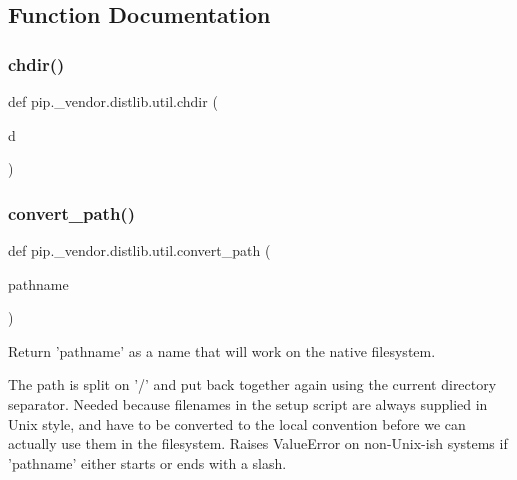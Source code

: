 \subsection{Function Documentation}
\mbox{\label{namespacepip_1_1__vendor_1_1distlib_1_1util_a3e7c4ee14860b0162af512a326ac4005}} 
\subsubsection{\texorpdfstring{chdir()}{chdir()}}
{\footnotesize\ttfamily def pip.\+\_\+vendor.\+distlib.\+util.\+chdir (\begin{DoxyParamCaption}\item[{}]{d }\end{DoxyParamCaption})}

\mbox{\label{namespacepip_1_1__vendor_1_1distlib_1_1util_a0935a67d848f4420d9c2250f5abfb56b}} 
\subsubsection{\texorpdfstring{convert\+\_\+path()}{convert\_path()}}
{\footnotesize\ttfamily def pip.\+\_\+vendor.\+distlib.\+util.\+convert\+\_\+path (\begin{DoxyParamCaption}\item[{}]{pathname }\end{DoxyParamCaption})}

\begin{DoxyVerb}Return 'pathname' as a name that will work on the native filesystem.

The path is split on '/' and put back together again using the current
directory separator.  Needed because filenames in the setup script are
always supplied in Unix style, and have to be converted to the local
convention before we can actually use them in the filesystem.  Raises
ValueError on non-Unix-ish systems if 'pathname' either starts or
ends with a slash.
\end{DoxyVerb}
 \mbox{\label{namespacepip_1_1__vendor_1_1distlib_1_1util_a4cd22029a8e2cbc2b4e596debb2e5a3f}} 
